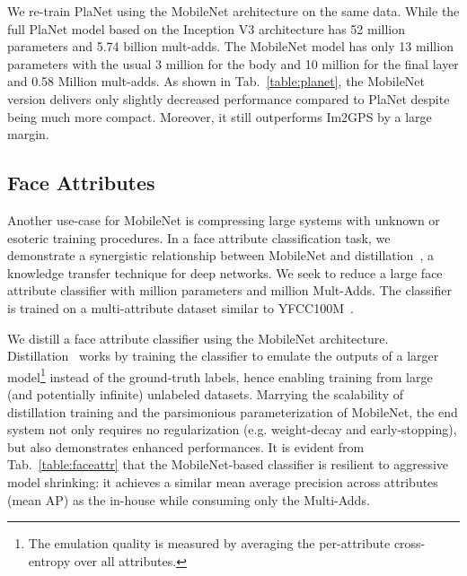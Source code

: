 \documentclass[10pt,twocolumn,letterpaper]{article}
\begin{document}
We re-train PlaNet using the MobileNet architecture on the same data. While the full PlaNet model based on the Inception V3 architecture \cite{szegedy2015rethinking} has 52 million parameters and 5.74 billion mult-adds. The MobileNet model has only 13 million parameters with the usual 3 million for the body and 10 million for the final layer and 0.58 Million mult-adds. As shown in Tab.~\ref{table:planet}, the MobileNet version delivers only slightly decreased performance compared to PlaNet despite being much more compact. Moreover, it still outperforms Im2GPS by a large margin.

\subsection{Face Attributes}
Another use-case for MobileNet is compressing large systems with unknown or esoteric training procedures. In a face attribute classification task, we demonstrate a synergistic relationship between MobileNet and distillation~\cite{hinton2015distilling}, a knowledge transfer technique for deep networks. We seek to reduce a large face attribute classifier with  million parameters and  million Mult-Adds. The classifier is trained on a multi-attribute dataset similar to YFCC100M~\cite{thomee2016yfcc100m}.

We distill a face attribute classifier using the MobileNet architecture. Distillation~\cite{hinton2015distilling} works by training the classifier to emulate the outputs of a larger model\footnote{The emulation quality is measured by averaging the per-attribute cross-entropy over all attributes.} instead of the ground-truth labels, hence enabling training from large (and potentially infinite) unlabeled datasets. Marrying the scalability of distillation training and the parsimonious parameterization of MobileNet, the end system not only requires no regularization (e.g. weight-decay and early-stopping), but also demonstrates enhanced performances. It is evident from Tab.~\ref{table:faceattr} that the MobileNet-based classifier is resilient to aggressive model shrinking: it achieves a similar mean average precision across attributes (mean AP) as the in-house while consuming only  the Multi-Adds. 
\end{document}
